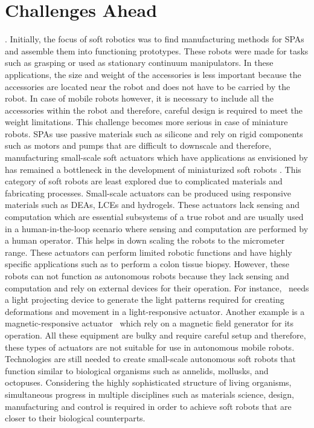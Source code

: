 \section{Challenges Ahead}.
Initially, the focus of soft robotics was to find manufacturing methods for SPAs and assemble them into functioning prototypes. These robots were made for tasks such as grasping or used as stationary continuum manipulators. In these applications, the size and weight of the accessories is less important because the accessories are located near the robot and does not have to be carried by the robot. In case of mobile robots however, it is necessary to include all the accessories within the robot and therefore, careful design is required to meet the weight limitations. This challenge becomes more serious in case of miniature robots. SPAs use passive materials such as silicone and rely on rigid components such as motors and pumps that are difficult to downscale and therefore, manufacturing small-scale soft actuators which have applications as envisioned by \cite{Hines2017} has remained a bottleneck in the development of miniaturized soft robots \cite{Majidi2019}. This category of soft robots are least explored due to complicated materials and fabricating processes. Small-scale actuators can be produced using responsive materials such as DEAs, LCEs and hydrogels. These actuators lack sensing and computation which are essential subsystems of a true robot and are usually used in a human-in-the-loop scenario where sensing and computation are performed by a human operator. This helps in down scaling the robots to the micrometer range. These actuators can perform limited robotic functions and have highly specific applications such as to perform a colon tissue biopsy. However, these robots can not function as autonomous robots because they lack sensing and computation and rely on external devices for their operation. For instance,~\cite{Palagi2016} needs a light projecting device to generate the light patterns required for creating deformations and movement in a light-responsive actuator. Another example is a magnetic-responsive actuator~\cite{Kim2018} which rely on a magnetic field generator for its operation. All these equipment are bulky and require careful setup and therefore, these types of actuators are not suitable for use in autonomous mobile robots. Technologies are still needed to create small-scale autonomous soft robots that function similar to biological organisms such as annelids, mollusks, and octopuses. Considering the highly sophisticated structure of living organisms, simultaneous progress in multiple disciplines such as materials science, design, manufacturing and control is required in order to achieve soft robots that are closer to their biological counterparts.


